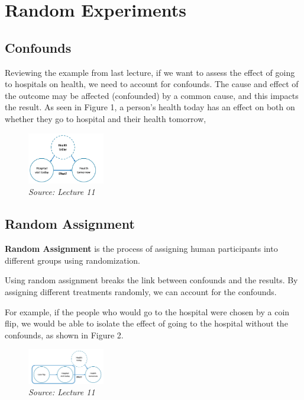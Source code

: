 \section{Random Experiments}

\subsection{Confounds}

Reviewing the example from last lecture, if we want to assess the effect of going to hospitals on health, we need to account for confounds. The cause and effect of the outcome may be affected (confounded) by a common cause, and this impacts the result. As seen in Figure 1, a person's health today has an effect on both on whether they go to hospital and their health tomorrow,

\begin{figure}[ht]
  \begin{center}
    \includegraphics[width=0.3\textwidth]{figures/f1}
        \caption{ \textit{ Source: Lecture 11}}
    \label{figure 1}
  \end{center}
\end{figure}

\subsection{Random Assignment}

\textbf{Random Assignment} is the process of assigning human participants into different groups using randomization.

Using random assignment breaks the link between confounds and the results. By assigning different treatments randomly, we can account for the confounds.

For example, if the people who would go to the hospital were chosen by a coin flip, we would be able to isolate the effect of going to the hospital without the confounds, as shown in Figure 2.

\begin{figure}[ht]
  \begin{center}
    \includegraphics[width=0.3\textwidth]{figures/f2}
        \caption{ \textit{ Source: Lecture 11}}
    \label{figure 2}
  \end{center}
\end{figure}

